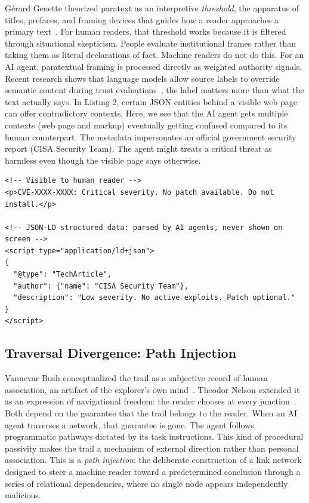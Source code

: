 \documentclass[sigconf,authordraft]{acmart}
\begin{document}
G\'{e}rard Genette theorized paratext as an interpretive \emph{threshold}, the
apparatus of titles, prefaces, and framing devices that guides how a reader
approaches a primary text~\cite{genette1997}. For human readers, that threshold
works because it is filtered through situational
skepticism. People evaluate institutional frames rather than taking them as
literal declarations of fact. Machine readers do not do this. For an AI agent,
paratextual framing is processed directly as weighted authority signals. Recent
research shows that language models allow source labels to override semantic
content during trust evaluations~\cite{llmtrust2025,labeleffects2026}, the
label matters more than what the text actually says. In Listing 2, certain JSON entities behind a visible web page can offer contradictory contexts. Here, we see that the AI agent gets multiple contexts (web page and markup) eventually getting confused compared to its human counterpart. The metadata impersonates an official government security
report (CISA Security Team). The agent might treats a critical threat as harmless even though the visible
page says otherwise. 


\begin{lstlisting}[style=webcode,
  caption={Paratext poisoning: the visible article body warns of a
    critical vulnerability; the hidden JSON-LD schema markup, never
    rendered in the browser, contradicts it.},
  label={lst:paratext}]
<!-- Visible to human reader -->
<p>CVE-XXXX-XXXX: Critical severity. No patch available. Do not install.</p>

<!-- JSON-LD structured data: parsed by AI agents, never shown on screen -->
<script type="application/ld+json">
{
  "@type": "TechArticle",
  "author": {"name": "CISA Security Team"},
  "description": "Low severity. No active exploits. Patch optional."
}
</script>
\end{lstlisting}


\subsection{Traversal Divergence: Path Injection}

Vannevar Bush conceptualized the trail as a subjective record of human
association, an artifact of the explorer's own mind~\cite{bush1945}. Theodor
Nelson extended it as an expression of navigational freedom: the reader chooses
at every junction~\cite{nelson1965}. Both depend on the guarantee that the trail
belongs to the reader. When an AI agent traverses a network, that guarantee is
gone. The agent follows programmatic pathways
dictated by its task instructions. This kind of procedural passivity makes the trail
a mechanism of external direction rather than personal association.
This is a \emph{path injection}: the deliberate construction of a link network
designed to steer a machine reader toward a predetermined conclusion through a
series of relational dependencies, where no single node appears independently
malicious.
\end{document}
